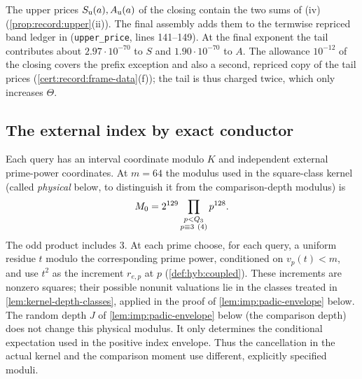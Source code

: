 The upper prices $S_{\rm u}(a),A_{\rm u}(a)$ of the closing contain the two
sums of (iv) (\cref{prop:record:upper}(ii)). The final assembly adds them to
the termwise repriced band ledger in
 (\texttt{upper\_price},
lines 141--149). At the final exponent the tail contributes about
$2.97\cdot10^{-70}$ to $S$ and $1.90\cdot10^{-70}$ to $A$. The allowance
$10^{-12}$ of the closing covers the prefix exception and also a second,
repriced copy of the tail prices (\cref{cert:record:frame-data}(f)); the tail
is thus charged twice, which only increases $\Theta$.

\subsection{The external index by exact conductor}\label{subsec:index-law}

Each query has an interval coordinate modulo $K$ and independent external
prime-power coordinates. At $m=64$ the modulus used in the
square-class kernel (called \emph{physical} below, to
 distinguish it from the comparison-depth modulus) is
\[
 \Mzero=2^{129}\prod_{\substack{p<Q_3\\p\equiv3\ (4)}}p^{128}.
\]
The odd product includes $3$. At each prime choose, for each query, a uniform residue $t$ modulo the corresponding prime power, conditioned on $v_p(t)<m$, and use $t^2$ as the increment $r_{e,p}$ at $p$ (\cref{def:hyb:coupled}).
These increments are nonzero squares; their possible nonunit valuations
lie in the classes treated in \cref{lem:kernel-depth-classes}, applied in the proof of \cref{lem:imp:padic-envelope} below.
The random depth $J$ of \cref{lem:imp:padic-envelope} below
(the comparison depth) does not change this physical modulus. It
only determines the conditional expectation used in the positive
index envelope. Thus the cancellation in the actual kernel and
the comparison moment use different, explicitly specified moduli.


